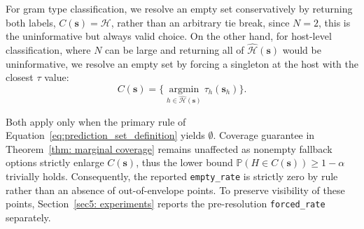 For gram type classification, we resolve an empty set conservatively by returning both labels, $C(\mathbf{s}) = 
\mathcal{H}$, rather than an arbitrary tie break, since $N=2$, this is the uninformative but always valid choice. 
On the other hand, for host-level classification, where $N$ can be large and returning all of $\hat{\mathcal{H}}(\mathbf{s})$ 
would be uninformative, we resolve an empty set by forcing a singleton at the host with the closest $\tau$ value:
\begin{equation*}
C(\mathbf{s}) = \Big\{ \operatorname*{argmin}_{h \in \hat{\mathcal{H}}(\mathbf{s})} \tau_h(\mathbf{s}_h) \Big\}.
\end{equation*}

Both apply only when the primary rule of Equation~\eqref{eq:prediction_set_definition} yields $\emptyset$.
Coverage guarantee in Theorem~\ref{thm: marginal coverage} remains unaffected as nonempty fallback options strictly 
enlarge $C(\mathbf{s})$, thus the lower bound $\mathbb{P}(H \in C(\mathbf{s})) \ge 1 - \alpha$ trivially holds. Consequently, 
the reported \texttt{empty\_rate} is strictly zero by rule rather than an absence of out-of-envelope points. 
To preserve visibility of these points, Section~\ref{sec5: experiments} reports the pre-resolution \texttt{forced\_rate} 
separately.




